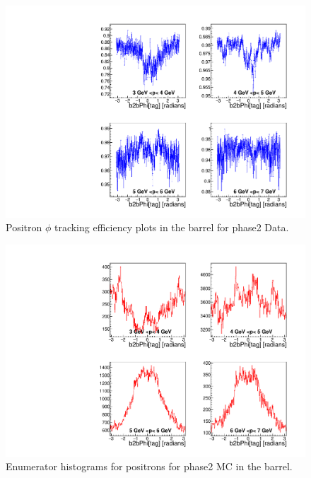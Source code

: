\documentclass[a4paper,11pt,twosided,final,german,openbib,pdftex,listof=totoc,bibliography=totoc]{scrbook}
\begin{document}
\begin{appendix}
\begin{figure}[!htbp]
	\centering
	\includegraphics[width=\textwidth]{Plots/master/xPMPhiepBarrel_Data}
	\caption[Momentum $\phi$ Positron Barrel Efficiency Phase2 Data]{Positron $\phi$ tracking efficiency plots in the barrel for phase2 Data.}
	\label{plt:PMPhiepBarrel_Data}
\end{figure}


\begin{figure}[!htbp]
	\centering
	\includegraphics[width=\textwidth]{Plots/master/xPMPhiepBarrelE_MC}
	\caption[Momentum $\phi$ Positron Barrel Enumerator Histogram Phase2 MC]{Enumerator histograms for positrons for phase2 MC in the barrel.}
	\label{plt:PMPhiepBarrelE_MC}
\end{figure}


\end{appendix}
\end{document}
